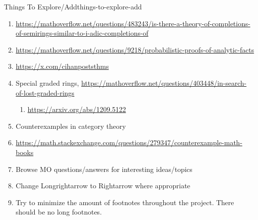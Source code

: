 \begin{remark}{Things To Explore/Add}{things-to-explore-add}
\begin{enumerate}
        \item \url{https://mathoverflow.net/questions/483243/is-there-a-theory-of-completions-of-semirings-similar-to-i-adic-completions-of}
        \item \url{https://mathoverflow.net/questions/9218/probabilistic-proofs-of-analytic-facts}
        \item \url{https://x.com/cihanpoststhms}
        \item Special graded rings, \url{https://mathoverflow.net/questions/403448/in-search-of-lost-graded-rings}
            \begin{enumerate}
                \item \url{https://arxiv.org/abs/1209.5122}
            \end{enumerate}
        \item Counterexamples in category theory
        \item \url{https://math.stackexchange.com/questions/279347/counterexample-math-books}
        \item Browse MO questions/answers for interesting ideas/topics
        \item Change Longrightarrow to Rightarrow where appropriate
        \item Try to minimize the amount of footnotes throughout the project. There should be no long footnotes.
    \end{enumerate}
\end{remark}
\begin{appendices}

\end{appendices}

